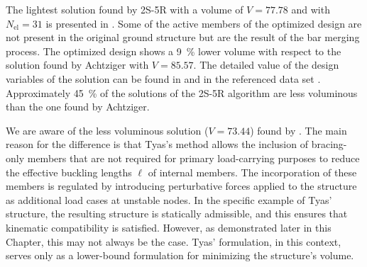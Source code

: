 The lightest solution found by 2S-5R with a volume of $V=77.78$ and with $N_{\text{el}}=31$ is presented in . Some of the active members of the optimized design are not present in the original ground structure but are the result of the bar merging process. The optimized design shows a \qty{9}{\%} lower volume with respect to the solution found by Achtziger  with $V=85.57$. The detailed value of the design variables of the solution can be found in  and in the referenced data set . Approximately \qty{45}{\%} of the solutions of the 2S-5R algorithm are less voluminous than the one found by Achtziger.

We are aware of the less voluminous solution ($V=73.44$) found by \cite{tyas_practical_2006}. The main reason for the difference is that Tyas's method allows the inclusion of bracing-only members that are not required for primary load-carrying purposes to reduce the effective buckling lengths $\ell$ of internal members. The incorporation of these members is regulated by introducing perturbative forces applied to the structure as additional load cases at unstable nodes. In the specific example of Tyas' structure, the resulting structure is statically admissible, and this ensures that kinematic compatibility is satisfied. However, as demonstrated later in this Chapter, this may not always be the case. Tyas' formulation, in this context, serves only as a lower-bound formulation for minimizing the structure's volume.

